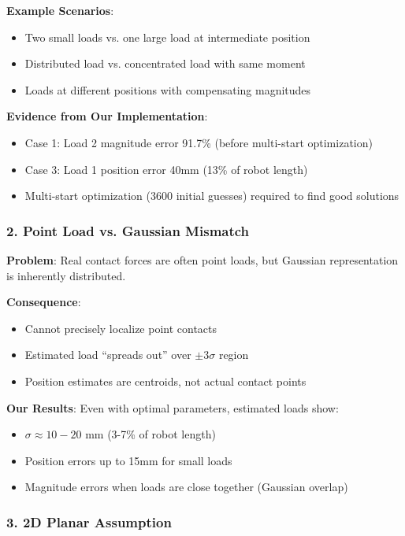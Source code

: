 \documentclass[11pt]{article}
\begin{document}
\textbf{Example Scenarios}:
\begin{itemize}
    \item Two small loads vs. one large load at intermediate position
    \item Distributed load vs. concentrated load with same moment
    \item Loads at different positions with compensating magnitudes
\end{itemize}

\textbf{Evidence from Our Implementation}:
\begin{itemize}
    \item Case 1: Load 2 magnitude error 91.7\% (before multi-start optimization)
    \item Case 3: Load 1 position error 40mm (13\% of robot length)
    \item Multi-start optimization (3600 initial guesses) required to find good solutions
\end{itemize}

\subsubsection{2. Point Load vs. Gaussian Mismatch}

\textbf{Problem}: Real contact forces are often point loads, but Gaussian representation is inherently distributed.

\textbf{Consequence}:
\begin{itemize}
    \item Cannot precisely localize point contacts
    \item Estimated load ``spreads out'' over $\pm 3\sigma$ region
    \item Position estimates are centroids, not actual contact points
\end{itemize}

\textbf{Our Results}: Even with optimal parameters, estimated loads show:
\begin{itemize}
    \item $\sigma \approx 10-20$ mm (3-7\% of robot length)
    \item Position errors up to 15mm for small loads
    \item Magnitude errors when loads are close together (Gaussian overlap)
\end{itemize}

\subsubsection{3. 2D Planar Assumption}
\end{document}

